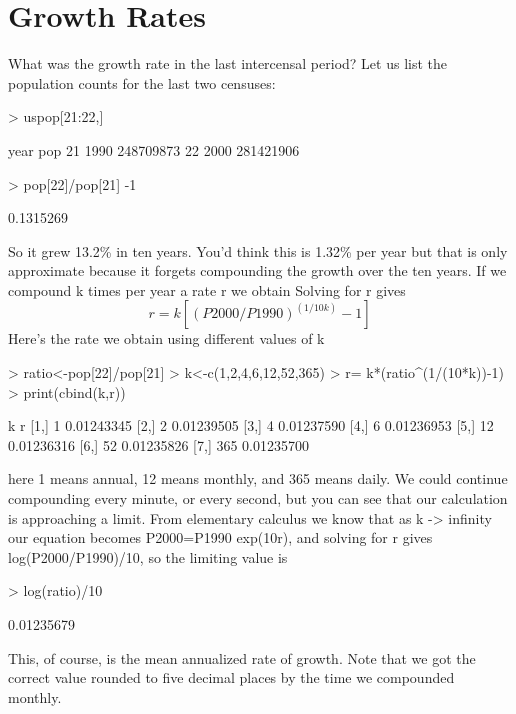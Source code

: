 \documentclass[a4paper]{article}
\begin{document}
\section*{Growth Rates}
What was the growth rate in the last intercensal period? Let us list the population counts for the last two censuses:
\begin{Schunk}
\begin{Sinput}
> uspop[21:22,]
\end{Sinput}
\begin{Soutput}
   year       pop
21 1990 248709873
22 2000 281421906
\end{Soutput}
\begin{Sinput}
> pop[22]/pop[21] -1
\end{Sinput}
\begin{Soutput}
[1] 0.1315269
\end{Soutput}
\end{Schunk}
So it grew 13.2\% in ten years. You'd think this is 1.32\% per year but that is only approximate because it forgets compounding the growth over the ten years.  If we compound k times per year a rate r we obtain Solving for r gives 
\[
r = k[(P2000/P1990)^{(1/10k)}-1]
\]
Here's the rate we obtain using different values of k
\begin{Schunk}
\begin{Sinput}
> ratio<-pop[22]/pop[21]
> k<-c(1,2,4,6,12,52,365)
> r= k*(ratio^(1/(10*k))-1)
> print(cbind(k,r))
\end{Sinput}
\begin{Soutput}
       k          r
[1,]   1 0.01243345
[2,]   2 0.01239505
[3,]   4 0.01237590
[4,]   6 0.01236953
[5,]  12 0.01236316
[6,]  52 0.01235826
[7,] 365 0.01235700
\end{Soutput}
\end{Schunk}
here 1 means annual, 12 means monthly, and 365 means daily. We could continue compounding every minute, or every second, but you can see that our calculation is approaching a limit. From elementary calculus we know that as k -> infinity our equation becomes P2000=P1990 exp(10r), and solving for r gives log(P2000/P1990)/10, so the limiting value is

\begin{Schunk}
\begin{Sinput}
> log(ratio)/10
\end{Sinput}
\begin{Soutput}
[1] 0.01235679
\end{Soutput}
\end{Schunk}
This, of course, is the mean annualized rate of growth. Note that we got the correct value rounded to five decimal places by the time we compounded monthly.
\end{document}
